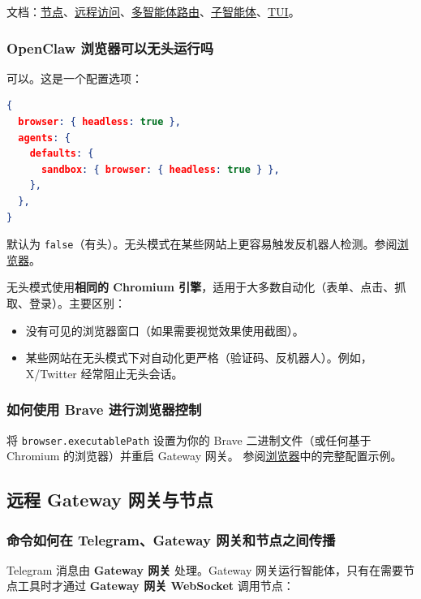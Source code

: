 文档：\href{/nodes}{节点}、\href{/gateway/remote}{远程访问}、\href{/concepts/multi-agent}{多智能体路由}、\href{/tools/subagents}{子智能体}、\href{/web/tui}{TUI}。

\subsubsection{OpenClaw 浏览器可以无头运行吗}


可以。这是一个配置选项：

\begin{lstlisting}[language=json]
{
  browser: { headless: true },
  agents: {
    defaults: {
      sandbox: { browser: { headless: true } },
    },
  },
}
\end{lstlisting}


默认为 \texttt{false}（有头）。无头模式在某些网站上更容易触发反机器人检测。参阅\href{/tools/browser}{浏览器}。

无头模式使用\textbf{相同的 Chromium 引擎}，适用于大多数自动化（表单、点击、抓取、登录）。主要区别：

\begin{itemize}
  \item 没有可见的浏览器窗口（如果需要视觉效果使用截图）。
  \item 某些网站在无头模式下对自动化更严格（验证码、反机器人）。例如，X/Twitter 经常阻止无头会话。
\end{itemize}


\subsubsection{如何使用 Brave 进行浏览器控制}


将 \texttt{browser.executablePath} 设置为你的 Brave 二进制文件（或任何基于 Chromium 的浏览器）并重启 Gateway 网关。
参阅\href{/tools/browser\#use-brave-or-another-chromium-based-browser}{浏览器}中的完整配置示例。

\subsection{远程 Gateway 网关与节点}


\subsubsection{命令如何在 Telegram、Gateway 网关和节点之间传播}


Telegram 消息由 \textbf{Gateway 网关} 处理。Gateway 网关运行智能体，只有在需要节点工具时才通过 \textbf{Gateway 网关 WebSocket} 调用节点：

